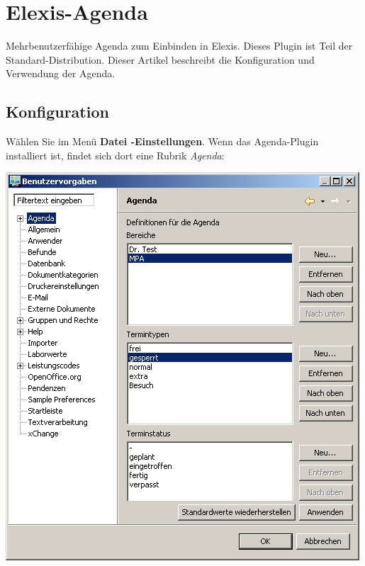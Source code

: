 
\section{Elexis-Agenda}\label{Agenda}
 Mehrbenutzerfähige Agenda zum Einbinden in Elexis. Dieses Plugin
ist Teil der Standard-Distribution.
Dieser Artikel beschreibt die Konfiguration und Verwendung der Agenda.
\subsection{Konfiguration}


Wählen Sie im Menü \textbf{Datei -Einstellungen}. Wenn das Agenda-Plugin installiert ist,
findet sich dort eine Rubrik \textit{Agenda}:




\includegraphics{images/settings1}

